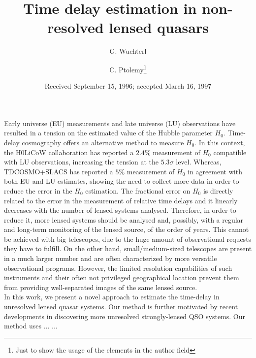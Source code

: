 \documentclass{aa}
\begin{document}
 


   \title{Time delay estimation in non-resolved lensed quasars}

   \author{G. Wuchterl
          \and
          C. Ptolemy\fnmsep\thanks{Just to show the usage
          of the elements in the author field}
          }


   \date{Received September 15, 1996; accepted March 16, 1997}

 
  \abstract
   {
   	Early universe (EU) measurements and late universe (LU) observations have resulted in a tension on the estimated value of the Hubble parameter $H_0$. Time-delay cosmography offers an alternative method to measure $H_0$. In this context, the H0LiCoW collaboration has reported a $2.4\%$ measurement of $H_0$ compatible with LU observations, increasing the tension at the $5.3 \sigma$ level. Whereas, TDCOSMO+SLACS has reported a $5\%$ measurement of $H_0$ in agreement with both EU and LU estimates, showing the need to collect more data in order to reduce the error in the $H_0$ estimation.
   	}
   { 
   	The fractional error on $H_0$ is directly related to the error in the measurement of relative time delays and it linearly decreases with the number of lensed systems analysed. Therefore, in order to reduce it, more lensed systems should be analysed and, possibly, with a regular and long-term monitoring of the lensed source, of the order of years. This cannot be achieved with big telescopes, due to the huge amount of observational requests they have to fulfill. On the other hand, small/medium-sized telescopes are present in a much larger number and are often characterized by more versatile observational programs. However, the limited resolution capabilities of such instruments and their often not privileged geographical location prevent them from providing well-separated images of the same lensed source. 
   	\\
   	In this work, we present a novel approach to estimate the time-delay in unresolved lensed quasar systems. Our method is further motivated by recent developments in discovering more unresolved strongly-lensed QSO systems.
	}
   {Our method uses ...}
   {...}
   {}
\end{document}

